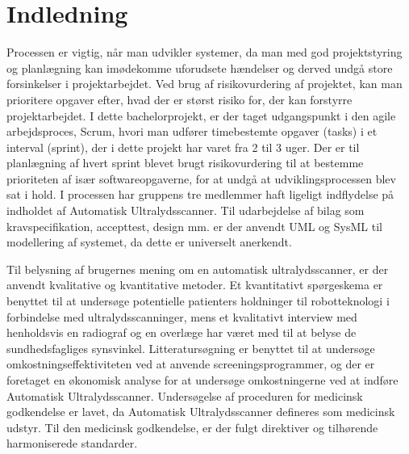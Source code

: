 \chapter{Indledning}\label{kapInd}
Processen er vigtig, når man udvikler systemer, da man med god projektstyring og planlægning kan imødekomme uforudsete hændelser og derved undgå store forsinkelser i projektarbejdet. Ved brug af risikovurdering af projektet, kan man prioritere opgaver efter, hvad der er størst risiko for, der kan forstyrre projektarbejdet. I dette bachelorprojekt, er der taget udgangspunkt i den agile arbejdsproces, Scrum, hvori man udfører timebestemte opgaver (tasks) i et interval (sprint), der i dette projekt har varet fra 2 til 3 uger. Der er til planlægning af hvert sprint blevet brugt risikovurdering til at bestemme prioriteten af især softwareopgaverne, for at undgå at udviklingsprocessen blev sat i hold. 
I processen har gruppens tre medlemmer haft ligeligt indflydelse på indholdet af Automatisk Ultralydsscanner. Til udarbejdelse af bilag som kravspecifikation, accepttest, design mm. er der anvendt UML og SysML til modellering af systemet, da dette er universelt anerkendt.

Til belysning af brugernes mening om en automatisk ultralydsscanner, er der anvendt kvalitative og kvantitative metoder. Et kvantitativt spørgeskema er benyttet til at undersøge potentielle patienters
holdninger til robotteknologi i forbindelse med ultralydsscanninger, mens et kvalitativt
interview med henholdsvis en radiograf og en overlæge har været med til at belyse de sundhedsfagliges
synsvinkel. Litteratursøgning er benyttet til at undersøge omkostningseffektiviteten ved at anvende screeningsprogrammer, og der er foretaget en økonomisk analyse for at undersøge omkostningerne ved at indføre Automatisk Ultralydsscanner. Undersøgelse af proceduren for medicinsk godkendelse er lavet, da Automatisk Ultralydsscanner defineres som medicinsk udstyr. Til den medicinsk godkendelse, er der fulgt direktiver og tilhørende harmoniserede standarder. 



